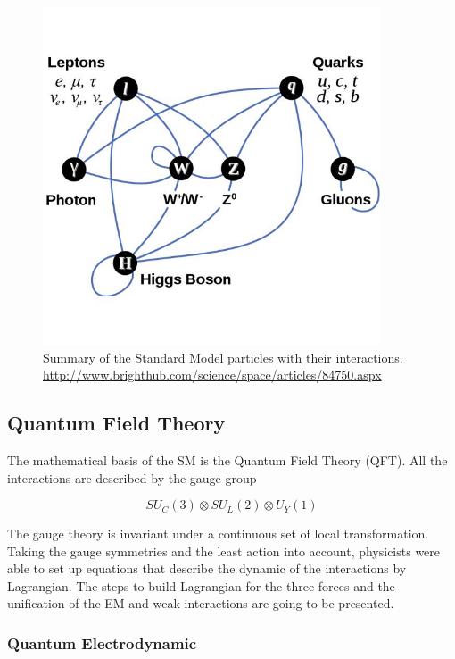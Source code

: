     \begin{figure}[h]
    \centering
      \includegraphics[width = 10cm]{Pictures/SM/elementaryParticles.jpg}
    \caption{Summary of the Standard Model particles with their interactions.\\ \url{http://www.brighthub.com/science/space/articles/84750.aspx}}
    \label{fig:partInterac}
    \end{figure}
      
    \subsection{Quantum Field Theory}

	The mathematical basis of the SM is the Quantum Field Theory (QFT). All the interactions are described by the gauge group 
    
      \begin{equation}
    	SU_C(3) \otimes SU_L(2) \otimes U_Y(1)
	  \end{equation}
    
    The gauge theory is invariant under a continuous set of local transformation.
    Taking the gauge symmetries and the least action into account, physicists were able to set up equations that describe the dynamic of the interactions by Lagrangian.
    The steps to build Lagrangian for the three forces and the unification of the EM and weak interactions are going to be presented. 
    
      \subsubsection{Quantum Electrodynamic}

